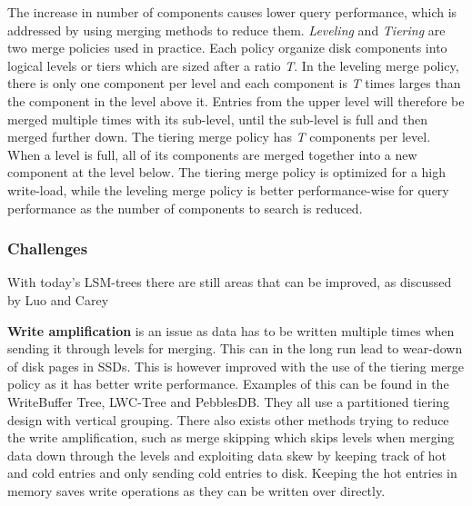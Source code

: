 The increase in number of components causes lower query performance, which is addressed by using merging methods to reduce them. \emph{Leveling} and \emph{Tiering} are two merge policies used in practice. Each policy organize disk components into logical levels or tiers which are sized after a ratio \emph{T}. In the leveling merge policy, there is only one component per level and each component is \emph{T} times larges than the component in the level above it. Entries from the upper level will therefore be merged multiple times with its sub-level, until the sub-level is full and then merged further down. The tiering merge policy has \emph{T} components per level. When a level is full, all of its components are merged together into a new component at the level below. The tiering merge policy is optimized for a high write-load, while the leveling merge policy is better performance-wise for query performance as the number of components to search is reduced\cite{LSMSurvey}. 

\subsubsection{Challenges}
With today's LSM-trees there are still areas that can be improved, as discussed by Luo and Carey\cite{LSMSurvey} \newline

\noindent
\textbf{Write amplification} is an issue as data has to be written multiple times when sending it through levels for merging. This can in the long run lead to wear-down of disk pages in SSDs. This is however improved with the use of the tiering merge policy as it has better write performance. Examples of this can be found in the WriteBuffer Tree\cite{WBTree}, LWC-Tree\cite{LWCTree1}\cite{LWCTree2} and PebblesDB\cite{PebblesDB}. They all use a partitioned tiering design with vertical grouping. There also exists other methods trying to reduce the write amplification, such as merge skipping which skips levels when merging data down through the levels\cite{SkipTree} and exploiting data skew by keeping track of hot and cold entries and only sending cold entries to disk\cite{TRIAD}. Keeping the hot entries in memory saves write operations as they can be written over directly. \newline

